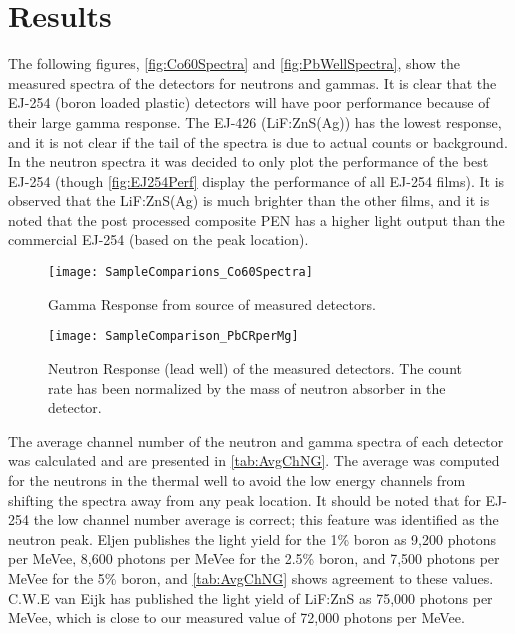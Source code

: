 \documentclass[onecolumn]{IEEEtran}
\begin{document}
\section{Results}
The following figures, \autoref{fig:Co60Spectra} and \autoref{fig:PbWellSpectra}, show the measured spectra of the detectors for neutrons and gammas.
It is clear that the EJ-254 (boron loaded plastic) detectors will have poor performance because of their large gamma response.
The EJ-426 (LiF:ZnS(Ag)) has the lowest response, and it is not clear if the tail of the spectra is due to actual counts or background.
In the neutron spectra it was decided to only plot the performance of the best EJ-254 (though \autoref{fig:EJ254Perf} display the performance of all EJ-254 films).
It is observed that the LiF:ZnS(Ag) is much brighter than the other films, and it is noted that the post processed composite PEN has a higher light output than the commercial EJ-254 (based on the peak location).
\begin{figure}
  \centering
  \texttt{[image: SampleComparions\_Co60Spectra]}
  \caption[Gamma Response of Measured Detectors]{Gamma Response from  source of measured detectors.}
  \label{fig:Co60Spectra}
\end{figure}
\begin{figure}
  \centering
  \texttt{[image: SampleComparison\_PbCRperMg]}
  \caption[Neutron Response of Measured Detectors]{Neutron Response (lead well) of the measured detectors. The count rate has been normalized by the mass of neutron absorber in the detector.}
  \label{fig:PbWellSpectra}
\end{figure}
The average channel number of the neutron and gamma spectra of each detector was calculated and are presented in \autoref{tab:AvgChNG}.
The average was computed for the neutrons in the thermal well to avoid the low energy channels from shifting the spectra away from any peak location.
It should be noted that for EJ-254 the low channel number average is correct; this feature was identified as the neutron peak.
Eljen publishes the light yield for the 1\% boron as 9,200 photons per MeVee, 8,600 photons per MeVee for the 2.5\% boron, and 7,500 photons per MeVee for the 5\% boron, and \autoref{tab:AvgChNG} shows agreement to these values.
C.W.E van Eijk has published the light yield of LiF:ZnS as 75,000 photons per MeVee, which is close to our measured value of 72,000 photons per MeVee.
\end{document}
